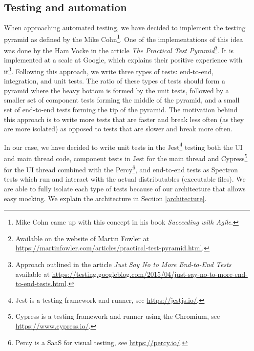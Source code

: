 \documentclass[thesismargins, english, thesislinespacing, onelinechapterstyle, upjsfrontpage]{rnthesis}
\begin{document}
\subsection{Testing and automation} \label{testing}

When approaching automated testing, we have decided to implement the testing pyramid as defined by the Mike Cohn\footnote{Mike Cohn came up with this concept in his book \textit{Succeeding with Agile}.}.
One of the implementations of this idea was done by the Ham Vocke in the article \textit{The Practical Test Pyramid}\footnote{Available on the website of Martin Fowler at \url{https://martinfowler.com/articles/practical-test-pyramid.html}.}.
It is implemented at a scale at Google, which explains their positive experience with it\footnote{Approach outlined in the article \textit{Just Say No to More End-to-End Tests} available at \url{https://testing.googleblog.com/2015/04/just-say-no-to-more-end-to-end-tests.html}.}.
Following this approach, we write three types of tests: end-to-end, integration, and unit tests.
The ratio of these types of tests should form a pyramid where the heavy bottom is formed by the unit tests, followed by a smaller set of component tests forming the middle of the pyramid, and a small set of end-to-end tests forming the tip of the pyramid.
The motivation behind this approach is to write more tests that are faster and break less often (as they are more isolated) as opposed to tests that are slower and break more often.

In our case, we have decided to write unit tests in the Jest\footnote{Jest is a testing framework and runner, see \url{https://jestjs.io/}.} testing both the UI and main thread code, component tests in Jest for the main thread and Cypress\footnote{Cypress is a testing framework and runner using the Chromium, see \url{https://www.cypress.io/}.} for the UI thread combined with the Percy\footnote{Percy is a SaaS for visual testing, see \url{https://percy.io/}.}, and end-to-end tests as Spectron tests which run and interact with the actual distributables (executable files).
We are able to fully isolate each type of tests because of our architecture that allows easy mocking.
We explain the architecture in Section \ref{architecture}.
\end{document}

